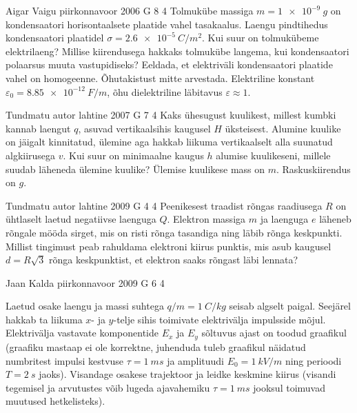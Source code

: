 \documentclass[11pt, twoside]{article}
\begin{document}
{{\fi
}

{Aigar Vaigu} %
{piirkonnavoor} %
{2006} %
{G 8} %
{4} %
{
\ifStatement
Tolmukübe massiga $m = \SI{1e-9}{g}$ on kondensaatori horisontaalsete plaatide vahel tasakaalus. Laengu pindtihedus kondensaatori plaatidel $\sigma = \SI{2,6e-5}{C/m^2}$. Kui suur on tolmukübeme elektrilaeng? Millise kiirendusega hakkaks tolmukübe langema, kui kondensaatori polaarsus muuta vastupidiseks? Eeldada, et elektriväli kondensaatori plaatide vahel on homogeenne. Õhutakistust mitte arvestada. Elektriline konstant $\varepsilon_0 = \SI{8,85e-12}{F/m}$, õhu dielektriline läbitavus $\varepsilon \approx 1$.
\fi
}

{Tundmatu autor} %
{lahtine} %
{2007} %
{G 7} %
{4} %
{
\ifStatement
Kaks ühesugust kuulikest, millest kumbki kannab laengut $q$, asuvad vertikaalsihis kaugusel $H$ üksteisest. Alumine kuulike on jäigalt kinnitatud, ülemine aga hakkab liikuma vertikaalselt alla suunatud algkiirusega $v$. Kui suur on minimaalne kaugus $h$ alumise kuulikeseni, millele suudab läheneda ülemine kuulike? Ülemise kuulikese mass on $m$. Raskuskiirendus on $g$.
\fi
}

{Tundmatu autor} %
{lahtine} %
{2009} %
{G 4} %
{4} %
{
\ifStatement
Peenikesest traadist rõngas raadiusega $R$ on ühtlaselt laetud negatiivse laenguga $Q$. Elektron massiga $m$ ja laenguga $e$ läheneb rõngale mööda sirget, mis on risti rõnga tasandiga ning läbib rõnga keskpunkti. Millist tingimust peab rahuldama elektroni kiirus punktis, mis asub kaugusel $d = R\sqrt 3$ rõnga keskpunktist, et elektron saaks rõngast läbi lennata?
\fi
}

{Jaan Kalda} %
{piirkonnavoor} %
{2009} %
{G 6} %
{4} %
{
\ifStatement
Laetud osake laengu ja massi suhtega $q/m = \SI{1}{C/kg}$ seisab algselt paigal. Seejärel hakkab ta liikuma $x$- ja $y$-telje sihis
toimivate elektrivälja impulsside mõjul. Elektrivälja vastavate komponentide $E_x$ ja $E_y$ sõltuvus ajast on toodud graafikul (graafiku mastaap
ei ole korrektne, juhenduda tuleb graafikul näidatud numbritest impulsi
kestvuse $\tau = \SI{1}{ms}$ ja amplituudi $E_0 = \SI{1}{kV/m}$ ning perioodi $T = \SI{2}{s}$
jaoks). Visandage osakese trajektoor ja leidke keskmine kiirus (visandi tegemisel ja arvutustes võib lugeda ajavahemiku $\tau = \SI{1}{ms}$ jooksul
toimuvad muutused hetkelisteks). 

}}
\end{document}
